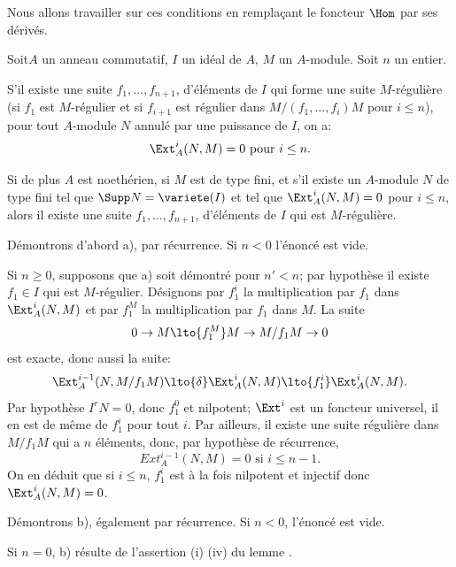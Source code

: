 Nous allons travailler sur ces conditions en rempla\c cant le
foncteur $\Hom$ par ses d\'eriv\'es.

\begin{theoreme} \label{III.2.2}
Soit\pageoriginaled $A$ un anneau commutatif, $I$ un id\'eal de $A$, $M$ un $A$-module. Soit $n$ un entier.

\begin{enumeratea}
\item
S'il existe une suite $f_1, \ldots, f_{n+1}$, d'\'el\'ements de $I$ qui forme une suite $M$-r\'eguli\`ere (\ie si $f_1$ est $M$-r\'egulier et si $f_{i+1}$ est r\'egulier dans $M/(f_1, \ldots, f_i)M$ pour $i\leq n$), pour tout $A$-module $N$ annul\'e par une puissance de $I$, on a:
\[
\Ext_A^i(N, M)=0 \text{ pour } i\leq n.
\]

\item
Si de plus $A$ est noeth\'erien, si $M$ est de type fini, et s'il existe un $A$-module $N$ de type fini tel que $\Supp N = \variete(I)$ et tel que $\Ext_A^i(N, M)=0$ pour $i\leq n$, alors il existe une suite $f_1, \ldots, f_{n+1}$, d'\'el\'ements de $I$ qui est $M$-r\'eguli\`ere.
\end{enumeratea}
\end{theoreme}

D\'emontrons d'abord a), par r\'ecurrence. Si $n<0$ l'\'enonc\'e est vide.

Si $n\geq 0$, supposons que a) soit d\'emontr\'e pour $n'<n$; par hypoth\`ese il existe $f_1\in I$ qui est $M$-r\'egulier. D\'esignons par $f_1^i$ la multiplication par $f_1$ dans $\Ext_A^i(N, M)$ et par $f_1^M$ la multiplication par $f_1$ dans $M$. La suite
\begin{equation} \label{eq:III.2.1}
0 \to M \lto{f_1^M} M \to M/f_1M \to 0
\end{equation}
est exacte, donc aussi la suite:
\[
\Ext_A^{i-1} (N, M/f_1M) \lto{\delta}\Ext_A^i (N, M) \lto{f_1^i} \Ext_A^i (N, M).
\]
Par hypoth\`ese $I^rN=0$, donc $f_1^0$ et nilpotent; $\Ext^i$ est un foncteur universel, il en est de m\^eme de $f_1^i$ pour tout $i$. Par ailleurs, il existe une suite r\'eguli\`ere dans $M/f_1 M$ qui a $n$ \'el\'ements, donc, par hypoth\`ese de r\'ecurrence,
\[
Ext_A^{i-1}(N, M)=0 \text{ si } i\leq n-1.
\]
On en d\'eduit que si $i\leq n$, $f_1^i$ est \`a la fois nilpotent et injectif donc $\Ext_A^i(N, M)=0$.

D\'emontrons b)\pageoriginale, \'egalement par r\'ecurrence. Si $n<0$, l'\'enonc\'e est vide.

Si $n=0$, b) r\'esulte de l'assertion (i) \ALORS (iv) du lemme .

